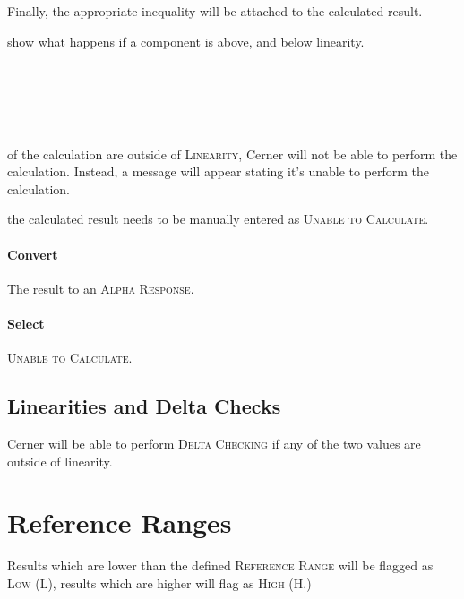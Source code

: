 Finally, the appropriate inequality will be attached to the calculated result.

 show what happens if a component is above, and below linearity.\\

\begin{description}

 \\

\\

\\

\\

\end{description}

 of the calculation are outside of \textsc{Linearity}, Cerner will not be able to perform the calculation. Instead, a message will appear stating it's unable to perform the calculation.\\


 the calculated result needs to be manually entered as \textsc{Unable to Calculate.}

\paragraph{Convert} The result to an \textsc{Alpha Response.}

\paragraph{Select} \textsc{Unable to Calculate.}


\subsection{Linearities and Delta Checks}
Cerner will  be able to perform \textsc{Delta Checking} if any of the two values are outside of linearity.

\section{Reference Ranges}
Results which are lower than the defined \textsc{Reference Range} will be flagged as \textsc{Low (L)}, results which are higher will flag as \textsc{High (H.)}



